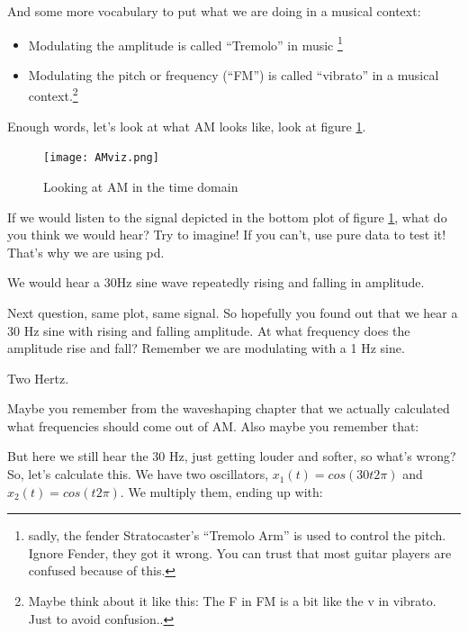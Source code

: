 And some more vocabulary to put what we are doing in a musical context:
\begin{itemize}
	\item Modulating the amplitude is called ``Tremolo'' in music \footnote{sadly, the fender Stratocaster's ``Tremolo Arm'' is used to control the pitch. Ignore Fender, they got it wrong. You can trust that most guitar players are confused because of this.}
	\item Modulating the pitch or frequency (``FM'') is called ``vibrato'' in a musical context.\footnote{Maybe think about it like this: The F in FM is a bit like the v in vibrato. Just to avoid confusion..}
\end{itemize}

Enough words, let's look at what AM looks like, look at figure \ref{fig:AMViz}.

\begin{figure}[h!]
	\centering
	\texttt{[image: AMviz.png]}
	\caption[AM time domain]
	{Looking at AM in the time domain}
	\label{fig:AMViz}
\end{figure}

\begin{question}
	If we would listen to the signal depicted in the bottom plot of figure \ref{fig:AMViz}, what do you think we would hear? Try to imagine! If you can't, use pure data to test it! That's why we are using pd.
\end{question}
\begin{Answer}
	We would hear a 30Hz sine wave repeatedly rising and falling in amplitude.
\end{Answer}

\begin{question}
	Next question, same plot, same signal. So hopefully you found out that we hear a 30 Hz sine with rising and falling amplitude. At what frequency does the amplitude rise and fall? Remember we are modulating with a 1 Hz sine.
\end{question}
\begin{Answer}
	Two Hertz.
\end{Answer}

Maybe you remember from the waveshaping chapter that we actually calculated what frequencies should come out of AM. Also maybe you remember that:

But here we still hear the 30 Hz, just getting louder and softer, so what's wrong?\\
So, let's calculate this. We have two oscillators, $x_1(t) = cos(30t2\pi)$ and $x_2(t)=cos(t2\pi)$. We multiply them, ending up with:

